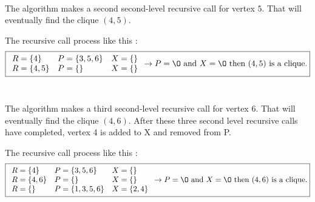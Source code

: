     \\
    \begin{minipage}{0.4\textwidth}
    \end{minipage}
    \begin{minipage}{0.6\textwidth}
        The algorithm makes a second second-level recursive call for vertex $5$. That will eventually find the clique $(4,5)$.
    \end{minipage}
    The recursive call process like this  :
    $$ \boxed{
        \begin{array}{lll}
            R = \{4\} & P = \{3,5,6\} & X = \{\} \\
            R = \{4,5\} & P = \{\} & X = \{\} \\
        \end{array} 
        \rightarrow P = \O \text{ and } X = \O \text{ then } (4,5) \text{ is a clique.}
    }$$
    \\
    \begin{minipage}{0.4\textwidth}
    \end{minipage}
    \begin{minipage}{0.6\textwidth}
        The algorithm makes a third second-level recursive call for vertex $6$. That will eventually find the clique $(4, 6)$. After these three second level recursive calls have completed, vertex 4 is added to X and removed from P.
    \end{minipage}
    The recursive call process like this  :
    $$ \boxed{
        \begin{array}{lll}
            R = \{4\} & P = \{3,5,6\} & X = \{\} \\
            R = \{4,6\} & P = \{\} & X = \{\} \\
            R = \{\} & P = \{1,3,5,6\} & X = \{2,4\} \\
        \end{array} 
        \rightarrow P = \O \text{ and } X = \O \text{ then } (4,6) \text{ is a clique.}
    }$$
